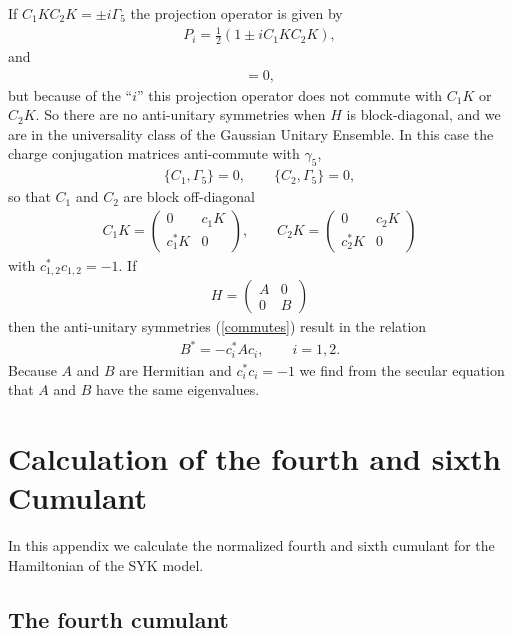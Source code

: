 \documentclass[aps,showpacs,floatfix,superscriptaddress,pre,11pt]{revtex4-1}
\newcommand{\eref}[1]{(\ref{#1})}
\newcommand{\be}{\begin{eqnarray}}
\newcommand{\ee}{\end{eqnarray}}
\newcommand{\bmat}{\left ( \begin{array}{cc} }
\newcommand{\emat}{\end{array} \right ) }
\begin{document}
        If $C_1KC_2K= \pm i\Gamma_5$ the projection operator is given
        by
        \be
        P_i = \frac 12( 1 \pm i C_1K C_2K),
        \ee
        and
        \be
           [P_i,H] =0,
           \ee
           but
        because of the ``$i$'' this projection operator does not commute with $C_1 K$ or
        $C_2K$. So there are no anti-unitary symmetries when $H$ is block-diagonal, and we are in the universality class of the Gaussian Unitary
        Ensemble. In this case the charge conjugation matrices anti-commute with $\gamma_5$,
        \be
        \{C_1,\Gamma_5\} =0, \qquad  \{C_2,\Gamma_5\} =0,
        \ee
        so that $C_1$ and $C_2$ are block off-diagonal
        \be
        C_1K = \bmat 0 & c_1 K \\ c_1^* K& 0 \emat, \qquad
        C_2K = \bmat 0 & c_2 K \\  c_2^*K & 0\emat
        \ee
        with $c_{1,2}^* c_{1,2}= - 1$.
        If
        \be
        H =\bmat A & 0 \\ 0 & B \emat
        \ee
        then the anti-unitary symmetries \eref{commutes} result in the relation
        \be
        B^* = -c_i^* A c_i, \qquad i = 1,2.
        \ee
        Because $A$ and $B$ are Hermitian and $c_i^* c_i = -1$ we find from the secular
        equation that $A$ and $B$ have the same eigenvalues.
        
\section{Calculation of the fourth and sixth Cumulant}

In this appendix we calculate the normalized fourth and sixth cumulant
for the Hamiltonian of the SYK model.

\subsection{The fourth cumulant}
\end{document}
